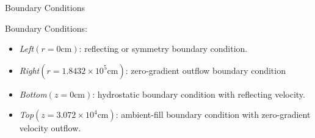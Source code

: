 \documentclass[
	11pt, %
]{beamer}
\begin{document}
\begin{frame}{Boundary Conditions}

    \begin{block}{Boundary Conditions:}
        \begin{itemize}
            \item {\it Left}$(r=0 \textrm{cm})$: reflecting or symmetry boundary condition.
            \item {\it Right}$(r=1.8432\times 10^5 \textrm{cm})$: zero-gradient outflow boundary condition
            \item {\it Bottom}$(z=0 \textrm{cm})$: hydrostatic boundary condition with reflecting velocity.
            \item {\it Top}$(z=3.072\times10^4 \textrm{cm})$: ambient-fill boundary condition with zero-gradient velocity outflow.
        \end{itemize}
    \end{block}
\end{frame}


     
\end{document}
